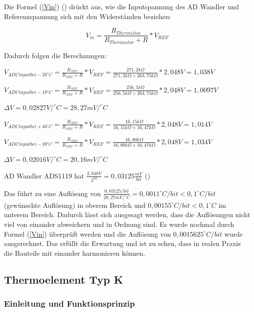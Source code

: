 \documentclass[12pt]{article}
\begin{document}
Die Formel (\ref{Vin}) (\cite{TexasInstruments.2018}) drückt aus, wie die Inputspannung des AD Wandler und Referenzspannung sich mit den Widerständen beziehen: 

\begin{equation}\label{Vin}
  V_{in} = \frac{R_{Thermistor}}{R_{Thermistor} + R} * V_{REF}
\end{equation}

Dadurch folgen die Berechnungen:
\begin{center}
$V_{ADC input bei -20^\circ C} = \frac{R_{NTC}}{R_{NTC} + R} * V_{REF} = \frac{271,2k\Omega}{271,2k\Omega + 263,75k\Omega} * 2,048V = 1,038V$ 

$V_{ADC input bei -19^\circ C} = \frac{R_{NTC}}{R_{NTC} + R} * V_{REF} = \frac{256,5k\Omega}{256,5k\Omega + 263,75k\Omega} * 2,048V = 1,0097V$

$\Delta V = 0,02827 V/^\circ C = 28,27mV/^\circ C$ 

$V_{ADC input bei +40^\circ C} = \frac{R_{NTC}}{R_{NTC} + R} * V_{REF} = \frac{16,15k\Omega}{16,15k\Omega + 16,47k\Omega} * 2,048V = 1,014V$ 

$V_{ADC input bei -39^\circ C} = \frac{R_{NTC}}{R_{NTC} + R} * V_{REF} = \frac{16,80k\Omega}{16,80k\Omega + 16,47k\Omega} * 2,048V = 1,034V$ 

$\Delta V = 0,02016 V/^\circ C = 20,16mV/^\circ C$ 

\end{center}

AD Wandler ADS1119 hat $\frac{2,048V}{2^{16}} = 0,03125 \frac{mV}{bit}$ (\cite{TexasInstruments.2018})

Das führt zu eine Auflösung von $\frac{0,03125/bit}{28,27mV/^{\circ} C} = 0,0011 ^{\circ} C/bit < 0,1 ^{\circ} C/bit$ (gewünschte Auflösung) in oberem Bereich und $0,00155 ^{\circ} C/bit < 0,1 ^{\circ} C$ im unterem Bereich. Dadurch lässt sich ausgesagt werden, dass die Auflösungen nicht viel von einander abweichern und in Ordnung sind.  Es wurde nochmal durch Formel (\ref{Vin}) überprüft werden und die Auflösung von $0,0015625^\circ C/bit$ wurde ausgerechnet. Das erfüllt die Erwartung und ist zu sehen, dass in realen Praxis die Bauteile mit einander harmonieren können.

\subsection{Thermoelement Typ K}

\subsubsection{Einleitung und Funktionsprinzip}
\end{document}
